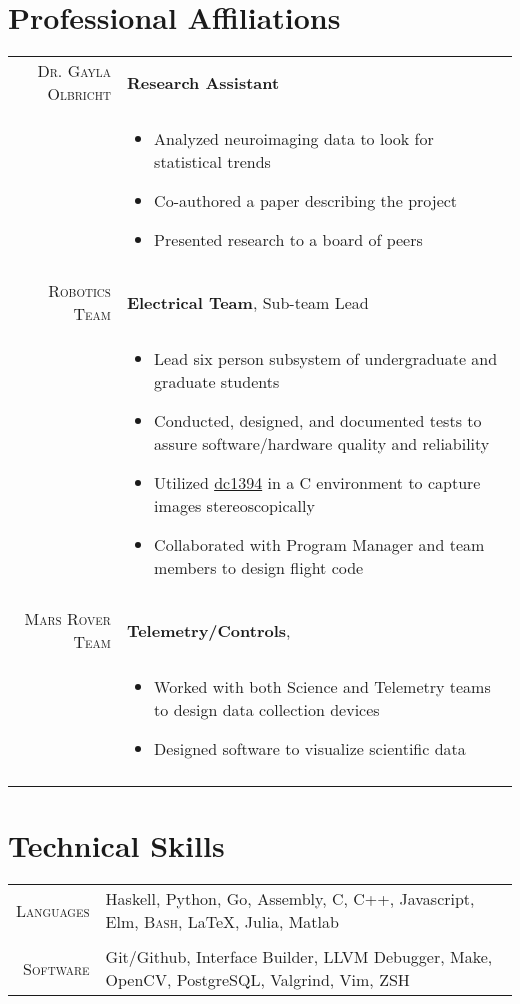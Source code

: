 \documentclass[a4paper,10pt]{article}
\newcommand{\br}{\\\multicolumn{2}{c}{}}
\begin{document}
\section{Professional Affiliations}
\begin{tabular}{r|p{15cm}}
    \textsc{Dr. Gayla Olbricht} & \textbf{Research Assistant} \\
     & \begin{itemize}
    \item Analyzed neuroimaging data to look for statistical trends
    \item Co-authored a paper describing the project
    \item Presented research to a board of peers
    \end{itemize} \br\\

    \textsc{Robotics Team} & \textbf{Electrical Team}, Sub-team Lead \\
     & \begin{itemize}
    \item Lead six person subsystem of undergraduate and graduate students
    \item Conducted, designed, and documented tests to assure software/hardware quality and reliability
    \item Utilized \href{https://sourceforge.net/projects/libdc1394/}{dc1394} in a C environment to capture images stereoscopically
    \item Collaborated with Program Manager and team members to design flight code
    \end{itemize} \br\\

    \textsc{Mars Rover Team} & \textbf{Telemetry/Controls}, \\
     & \begin{itemize}
       \item{Worked with both Science and Telemetry teams to design data collection devices}
       \item{Designed software to visualize scientific data}
     \end{itemize} \br\\


\end{tabular}

\section{Technical Skills}
\begin{tabular}{r|p{15cm}}
    \textsc{\small Languages} &
    Haskell,
    Python,
    Go,
    Assembly,
    C,
    C++,
    Javascript,
    Elm,
    \textsc{Bash},
    \LaTeX{},
    Julia,
    Matlab \br\\

    \textsc{\small Software} &
    Git/Github,
    Interface Builder,
    LLVM Debugger,
    Make,
    OpenCV,
    PostgreSQL,
    Valgrind,
    Vim,
    ZSH
\end{tabular}
\end{document}
